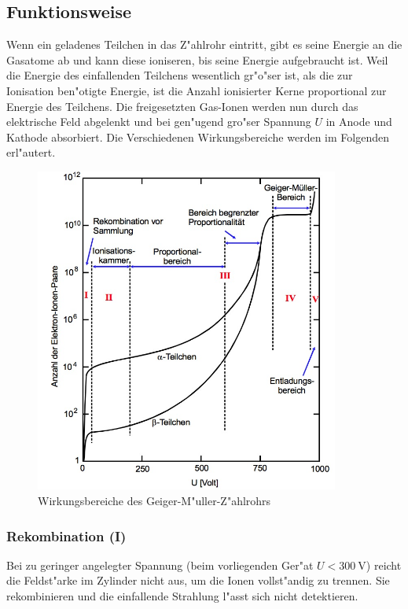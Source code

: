 	\subsection{Funktionsweise}
	\label{subsec:funktionsweise}
		Wenn ein geladenes Teilchen in das Z"ahlrohr eintritt, gibt es seine Energie an die Gasatome ab und kann diese ioniseren, bis seine Energie aufgebraucht ist.
		Weil die Energie des einfallenden Teilchens wesentlich gr"o"ser ist, als die zur Ionisation ben"otigte Energie, ist die Anzahl ionisierter Kerne proportional zur Energie des Teilchens.
		Die freigesetzten Gas-Ionen werden nun durch das elektrische Feld abgelenkt und bei gen"ugend gro"ser Spannung $U$ in Anode und Kathode absorbiert.
		Die Verschiedenen Wirkungsbereiche werden im Folgenden erl"autert.

		\begin{figure}[h]
			\centering
			\includegraphics[width = 10cm]{img/bereiche.jpeg}
			\caption{Wirkungsbereiche des Geiger-M"uller-Z"ahlrohrs}
			\label{fig:bereiche}
		\end{figure}

		\subsubsection{Rekombination (I)}
		\label{subsubsec:rekombination}
			Bei zu geringer angelegter Spannung (beim vorliegenden Ger"at $U < \SI{300}{\volt}$) reicht die Feldst"arke im Zylinder nicht aus, um die Ionen vollst"andig zu trennen.
			Sie rekombinieren und die einfallende Strahlung l"asst sich nicht detektieren.

